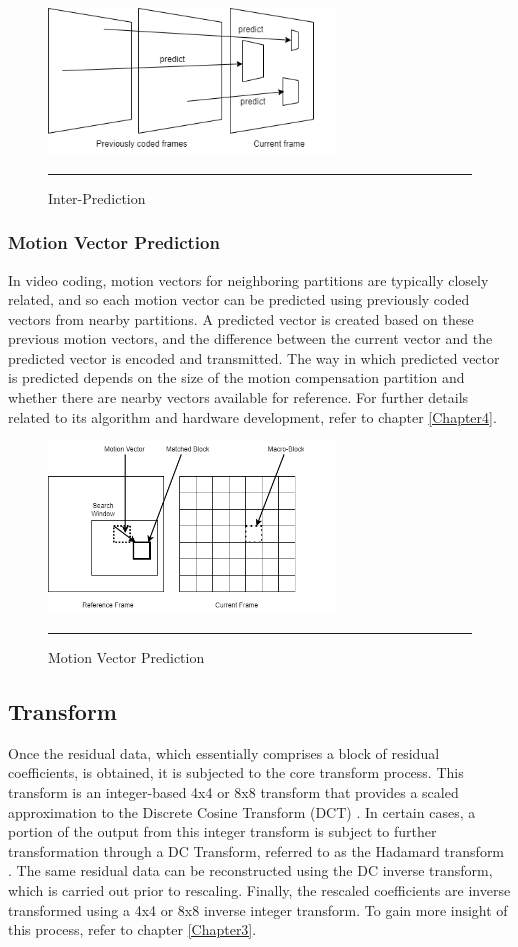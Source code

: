 \begin{figure}[H]
	\centering
	\includegraphics[width = 3in]{./Figures/interprediction.png}
	\rule{35em}{0.5pt}
	\caption{Inter-Prediction}
	\label{fig:interprediction}
\end{figure}

\subsubsection{Motion Vector Prediction}
In video coding, motion vectors for neighboring partitions are typically closely related, and so each motion vector can be predicted using previously coded vectors from nearby partitions. A predicted vector is created based on these previous motion vectors, and the difference between the current vector and the predicted vector is encoded and transmitted. The way in which predicted vector is predicted depends on the size of the motion compensation partition and whether there are nearby vectors available for reference. For further details related to its algorithm and hardware development, refer to chapter \ref{Chapter4}.

\begin{figure}[H]
	\centering
	\includegraphics[width = 3in]{./Figures/motionvector.png}
	\rule{35em}{0.5pt}
	\caption{Motion Vector Prediction}
	\label{fig:motionvector}
\end{figure}

\subsection{Transform}
Once the residual data, which essentially comprises a block of residual coefficients, is obtained, it is subjected to the core transform process. This transform is an integer-based 4x4 or 8x8 transform that provides a scaled approximation to the Discrete Cosine Transform (DCT) \cite{richardson2010h264}. In certain cases, a portion of the output from this integer transform is subject to further transformation through a DC Transform, referred to as the Hadamard transform \cite{richardson2010h264}. The same residual data can be reconstructed using the DC inverse transform, which is carried out prior to rescaling. Finally, the rescaled coefficients are inverse transformed using a 4x4 or 8x8 inverse integer transform. To gain more insight of this process, refer to chapter \ref{Chapter3}.

